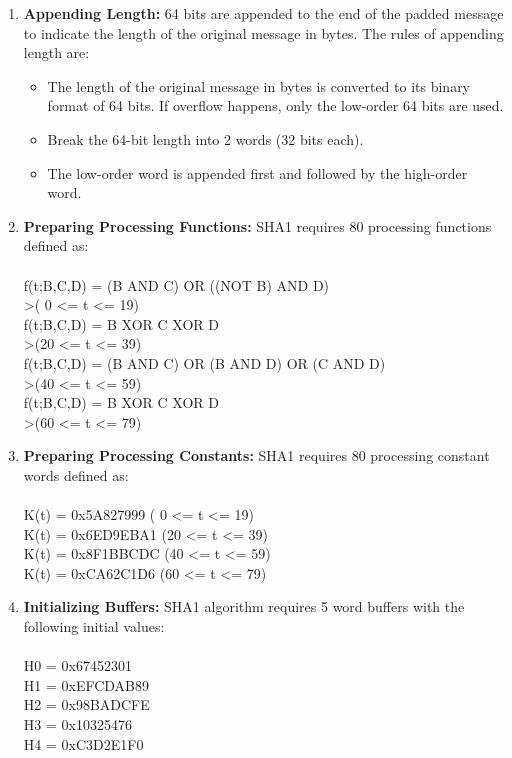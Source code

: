 \documentclass[a4paper,12pt]{article}
\newenvironment{codefont}{\fontfamily{pcr}\selectfont}{\par}
\begin{document}
\begin{enumerate}
		\item \textbf{Appending Length:} 64 bits are appended to the end of the padded message to indicate the length of the original message in bytes. The rules of appending length are:
			\begin{itemize}
				\item The length of the original message in bytes is converted to its binary format of 64 bits. If overflow happens, only the low-order 64 bits are used. 
				\item Break the 64-bit length into 2 words (32 bits each). 
				\item The low-order word is appended first and followed by the high-order word. 
			\end{itemize} 
		\item \textbf{Preparing Processing Functions:} SHA1 requires 80 processing functions defined as: \\\\
		\begin{codefont}
			f(t;B,C,D) = (B AND C) OR ((NOT B) AND D)\\        >\qquad ( 0 <= t <= 19)\\ 
			f(t;B,C,D) = B XOR C XOR D\\                       >\qquad (20 <= t <= 39)\\ 
			f(t;B,C,D) = (B AND C) OR (B AND D) OR (C AND D)\\ >\qquad (40 <= t <= 59)\\ 
			f(t;B,C,D) = B XOR C XOR D\\                       >\qquad (60 <= t <= 79)\\ 
		\end{codefont}
        
        \item \textbf{Preparing Processing Constants:} SHA1 requires 80 processing constant words defined as: \\\\
        \begin{codefont}
			K(t) = 0x5A827999         ( 0 <= t <= 19)\\ 
   			K(t) = 0x6ED9EBA1         (20 <= t <= 39)\\ 
   			K(t) = 0x8F1BBCDC         (40 <= t <= 59)\\ 
   			K(t) = 0xCA62C1D6         (60 <= t <= 79)\\ 
		\end{codefont}
        
    	\item \textbf{Initializing Buffers:} SHA1 algorithm requires 5 word buffers with the following initial values:\\\\
        \begin{codefont}
			H0 = 0x67452301\\
   			H1 = 0xEFCDAB89\\
   			H2 = 0x98BADCFE\\
   			H3 = 0x10325476\\
   			H4 = 0xC3D2E1F0\\
		\end{codefont}
        

\end{enumerate}
\end{document}
